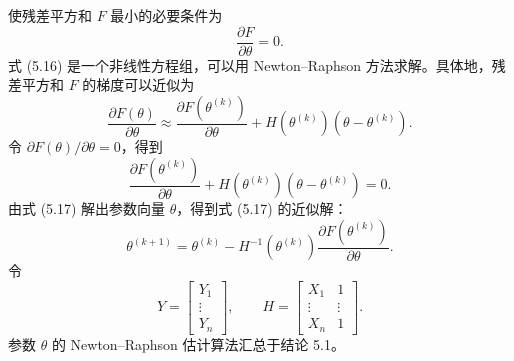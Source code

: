 使残差平方和 $F$ 最小的必要条件为
\begin{equation}
\frac{\partial F}{\partial\theta}=0.
\tag{5.16}
\end{equation}
式 (5.16) 是一个非线性方程组，可以用 Newton–Raphson 方法求解。具体地，残差平方和 $F$ 的梯度可以近似为
\[
\frac{\partial F(\theta)}{\partial\theta}
\approx \frac{\partial F(\theta^{(k)})}{\partial\theta}
+H(\theta^{(k)})(\theta-\theta^{(k)}).
\]
令 $\partial F(\theta)/\partial\theta=0$，得到
\begin{equation}
\frac{\partial F(\theta^{(k)})}{\partial\theta}
+H(\theta^{(k)})(\theta-\theta^{(k)})=0.
\tag{5.17}
\end{equation}
由式 (5.17) 解出参数向量 $\theta$，得到式 (5.17) 的近似解：
\begin{equation}
\theta^{(k+1)}=\theta^{(k)}-H^{-1}(\theta^{(k)})
\frac{\partial F(\theta^{(k)})}{\partial\theta}.
\tag{5.18}
\end{equation}
令
\[
Y=\begin{bmatrix}Y_1\\\vdots\\Y_n\end{bmatrix},\qquad
H=\begin{bmatrix}X_1&1\\\vdots&\vdots\\X_n&1\end{bmatrix}.
\]
参数 $\theta$ 的 Newton–Raphson 估计算法汇总于结论 5.1。

